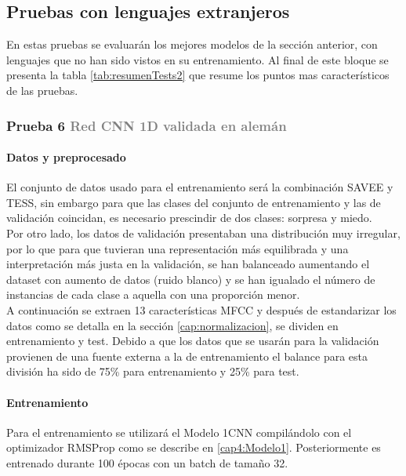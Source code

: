 \documentclass[11pt,a4paper,spanish]{book}
\begin{document}
	\subsection{Pruebas con lenguajes extranjeros}
	En estas pruebas se evaluarán los mejores modelos de la sección anterior, con lenguajes que no han sido vistos en su entrenamiento. Al final de este bloque se presenta la tabla \ref{tab:resumenTests2} que resume los puntos mas característicos de las pruebas.
	
	\subsubsection{\large Prueba 6 {\normalsize \textcolor{Gray}{Red CNN 1D validada en alemán}}}
	
	\hfill \begin{minipage}{\dimexpr\textwidth-1cm}
		
		\paragraph{Datos y preprocesado}  El conjunto de datos usado para el entrenamiento será la combinación SAVEE y TESS, sin embargo para que las clases del conjunto de entrenamiento y las de validación coincidan, es necesario prescindir de dos clases: sorpresa y miedo.\\ 
		Por otro lado, los datos de validación presentaban una distribución muy irregular, por lo que para que tuvieran una representación más equilibrada y una interpretación más justa en la validación, se han balanceado aumentando el dataset con aumento de datos (ruido blanco) y se han igualado el número de instancias de cada clase a aquella con una proporción menor.\\
		A continuación se extraen 13 características MFCC y después de estandarizar los datos como se detalla en la sección \ref{cap:normalizacion}, se dividen en entrenamiento y test. Debido a que los datos que se usarán para la validación provienen de una fuente externa a la de entrenamiento el balance para esta división ha sido de 75\% para entrenamiento y 25\% para test.\\
		
		\paragraph{Entrenamiento} Para el entrenamiento se utilizará el Modelo 1CNN compilándolo con el optimizador RMSProp como se describe en \ref{cap4:Modelo1}. Posteriormente es entrenado durante 100 épocas con un batch de tamaño 32.
		
	\end{minipage}
\end{document}
